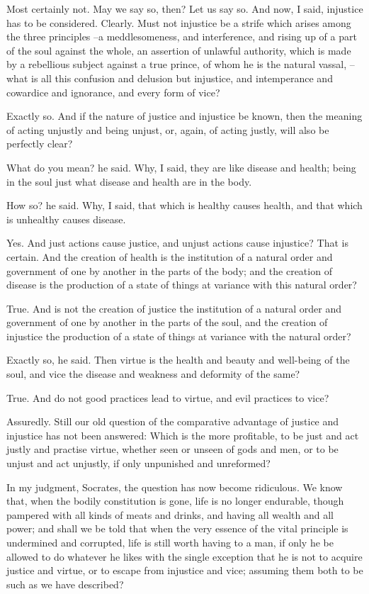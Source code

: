 Most certainly not.
May we say so, then?
Let us say so.
And now, I said, injustice has to be considered.
Clearly.
Must not injustice be a strife which arises among the three principles --a meddlesomeness, and interference, and rising up of a part of the soul against the whole, an assertion of unlawful authority, which is made by a rebellious subject against a true prince, of whom he is the natural vassal, --what is all this confusion and delusion but injustice, and intemperance and cowardice and ignorance, and every form of vice?

Exactly so.
And if the nature of justice and injustice be known, then the meaning of acting unjustly and being unjust, or, again, of acting justly, will also be perfectly clear?

What do you mean? he said.
Why, I said, they are like disease and health; being in the soul just what disease and health are in the body.

How so? he said.
Why, I said, that which is healthy causes health, and that which is unhealthy causes disease.

Yes.
And just actions cause justice, and unjust actions cause injustice?
That is certain.
And the creation of health is the institution of a natural order and government of one by another in the parts of the body; and the creation of disease is the production of a state of things at variance with this natural order?

True.
And is not the creation of justice the institution of a natural order and government of one by another in the parts of the soul, and the creation of injustice the production of a state of things at variance with the natural order?

Exactly so, he said.
Then virtue is the health and beauty and well-being of the soul, and vice the disease and weakness and deformity of the same?

True.
And do not good practices lead to virtue, and evil practices to vice?

Assuredly.
Still our old question of the comparative advantage of justice and injustice has not been answered: Which is the more profitable, to be just and act justly and practise virtue, whether seen or unseen of gods and men, or to be unjust and act unjustly, if only unpunished and unreformed?

In my judgment, Socrates, the question has now become ridiculous. We know that, when the bodily constitution is gone, life is no longer endurable, though pampered with all kinds of meats and drinks, and having all wealth and all power; and shall we be told that when the very essence of the vital principle is undermined and corrupted, life is still worth having to a man, if only he be allowed to do whatever he likes with the single exception that he is not to acquire justice and virtue, or to escape from injustice and vice; assuming them both to be such as we have described?

